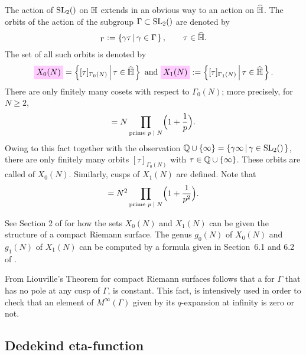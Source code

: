 \documentclass{article}
\begin{document}
The action of $\SL2Z$ on $\mathbb{H}$ extends in an obvious way to an
action on $\widehat{\mathbb{H}}$. The orbits of the action of the subgroup
$\Gamma\subset \SL2Z$ are denoted by
\begin{gather*} [\tau]_\Gamma :=
  \SetDef{\gamma\tau}{\gamma\in\Gamma},\qquad\tau\in\setHhat.
\end{gather*}
The set of all such orbits is denoted by
\begin{gather*}
  \defineNotation[X-0]{X_0(N)} = \SetDef{[\tau]_{\Gamma_0(N)}}{\tau\in\setHhat}
  \text{ and }
  \defineNotation[X-1]{X_1(N)} := \SetDef{[\tau]_{\Gamma_1(N)}}{\tau\in\setHhat}.
\end{gather*}
There are only finitely many cosets with respect
to $\Gamma_0(N)$; more precisely, for $N\ge2$,
\begin{gather*}
  [\SL2Z : \Gamma_0(N)]
  =
  N \prod_{\text{prime $\divides{p}{N}$}} \Bigl(1+\frac{1}{p}\Bigr).
\end{gather*}
Owing to this fact together with the observation
$\setQ\cup\{\infty\}=\SetDef{\gamma\infty}{\gamma\in\SL2Z}$,
%
there are only finitely many orbits $[\tau]_{\Gamma_0(N)}$ with
$\tau\in\mathbb{Q}\cup\left\{\infty\right\}$. These orbits are called
 of $X_0(N)$.
Similarly, cusps of $X_1(N)$ are defined. Note that
\begin{gather*}
  [\SL2Z : \Gamma_1(N)]
  =
  N^2 \prod_{\text{prime $\divides{p}{N}$}} \Bigl(1+\frac{1}{p^2}\Bigr).
\end{gather*}

See Section 2 of \cite{DiamondShurman_ModularForms_2005} for how the
sets $X_0(N)$ and $X_1(N)$ can be given the structure of a compact
Riemann surface. The genus $g_0(N)$ of $X_0(N)$ and $g_1(N)$ of
$X_1(N)$ can be computed by a formula given in Section~6.1 and 6.2 of
\cite{Stein_ModularFormas_2007}.

From Liouville's Theorem for compact Riemann surfaces follows that a
 for $\Gamma$ that has no pole at any cusp
of $\Gamma$, is constant. This fact, is intensively used in order to
check that an element of $M^\infty(\Gamma)$ given by its $q$-expansion
at infinity is zero or not.




\subsection{Dedekind eta-function}
\end{document}
